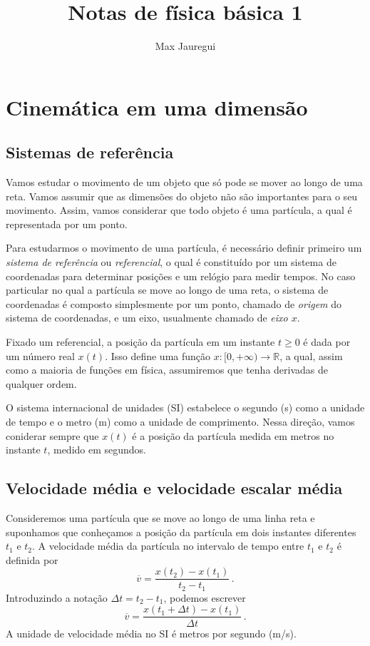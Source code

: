 \documentclass[12pt,a4paper]{article}
\title{Notas de física básica 1}
\author{Max Jauregui}
\newcommand{\R}{\mathbb{R}}
\theoremstyle{definition}
\begin{document}
\maketitle
\section{Cinemática em uma dimensão}

\subsection{Sistemas de referência}

Vamos estudar o movimento de um objeto que só pode se mover ao longo
de uma reta. Vamos assumir que as dimensões do objeto não são
importantes para o seu movimento. Assim, vamos considerar que todo
objeto é uma partícula, a qual é representada por um ponto.

Para estudarmos o movimento de uma partícula, é necessário definir
primeiro um \emph{sistema de referência} ou \emph{referencial}, o qual
é constituído por um sistema de coordenadas para determinar posições e
um relógio para medir tempos. No caso particular no qual a partícula
se move ao longo de uma reta, o sistema de coordenadas é composto
simplesmente por um ponto, chamado de \emph{origem} do sistema de
coordenadas, e um eixo, usualmente chamado de \emph{eixo $x$}.

Fixado um referencial, a posição da partícula em um instante $t\ge 0$
é dada por um número real $x(t)$. Isso define uma função
$x:[0,+\infty)\to\R$, a qual, assim como a maioria de funções em
física, assumiremos que tenha derivadas de qualquer ordem.

O sistema internacional de unidades (SI) estabelece o segundo (s) como
a unidade de tempo e o metro (m) como a unidade de comprimento. Nessa
direção, vamos coniderar sempre que $x(t)$ é a posição da partícula
medida em metros no instante $t$, medido em segundos.

\subsection{Velocidade média e velocidade escalar média}

Consideremos uma partícula que se move ao longo de uma linha reta e
suponhamos que conheçamos a posição da partícula em dois instantes
diferentes $t_1$ e $t_2$. A velocidade média da partícula no intervalo
de tempo entre $t_1$ e $t_2$ é definida por
$$\overline v=\frac{x(t_2)-x(t_1)}{t_2-t_1}\,.$$
Introduzindo a notação $\Delta t=t_2-t_1$, podemos escrever
$$\overline{v}=\frac{x(t_1+\Delta t)-x(t_1)}{\Delta t}\,.$$
A unidade de velocidade média no SI é metros por segundo (m/s).
\end{document}
